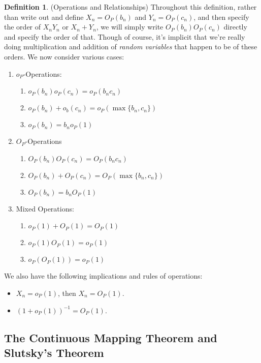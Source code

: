 \documentclass[12pt]{article}
\theoremstyle{plain}
\theoremstyle{definition}
\newtheorem{defn}[thm]{Definition}
\theoremstyle{remark}
\begin{document}
\clearpage
\begin{defn}(Operations and Relationships)
Throughout this definition, rather than write out and define $X_n =
O_P(b_n)$ and $Y_n=O_P(c_n)$, and then specify the order of $X_nY_n$ or
$X_n+Y_n$, we will simply write $O_P(b_n)O_P(c_n)$ directly and specify
the order of that. Though of course, it's implicit that we're really
doing multiplication and addition of \emph{random variables} that
happen to be of these orders. We now consider various cases:
\begin{enumerate}
  \item $o_P$-Operations:
    \begin{enumerate}
      \item $o_P(b_n)o_P(c_n)=o_P(b_nc_n)$
      \item $o_P(b_n)+o_b(c_n) = o_P(\max\{b_n, c_n\})$
      \item $o_P(b_n)=b_no_P(1)$
    \end{enumerate}

  \item $O_P$-Operations
    \begin{enumerate}
      \item $O_P(b_n)O_P(c_n)=O_P(b_nc_n)$
      \item $O_P(b_n)+O_P(c_n) = O_P(\max\{b_n, c_n\})$
      \item $O_P(b_n)=b_nO_P(1)$
    \end{enumerate}

  \item Mixed Operations:
    \begin{enumerate}
      \item $o_P(1)+O_P(1) = O_P(1)$
      \item $o_P(1)O_P(1)=o_P(1)$
      \item $o_P(O_P(1))=o_P(1)$
    \end{enumerate}
\end{enumerate}
We also have the following implications and rules of operations:
\begin{itemize}
  \item $X_n=o_P(1)$, then $X_n=O_P(1)$.
  \item $(1+o_P(1))^{-1}=O_P(1)$.
\end{itemize}
\end{defn}


\clearpage
\subsection{The Continuous Mapping Theorem and Slutsky's Theorem}
\end{document}
